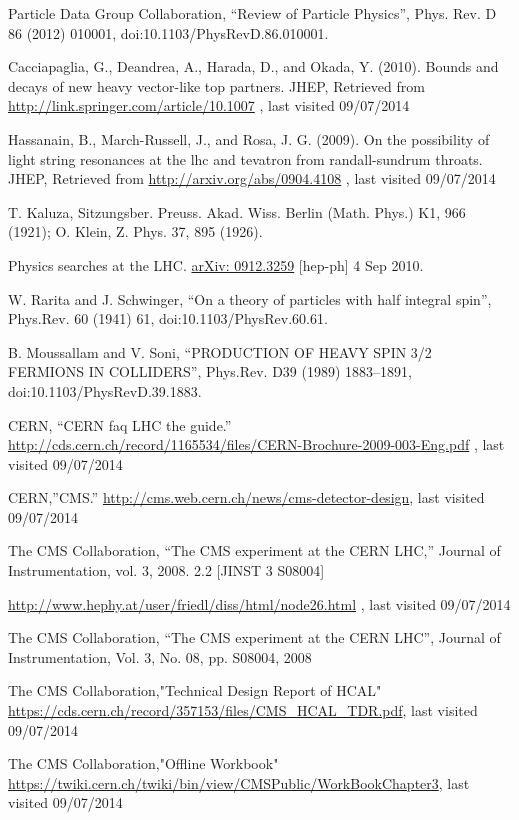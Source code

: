 \documentclass[12pt,oneandhalf,chaparabic,phys,ms,eng]{metu}
\begin{document}
\begin{thebibliography}{99}
  Particle Data Group Collaboration, “Review of Particle Physics”, Phys. Rev. D 86 (2012) 010001, doi:10.1103/PhysRevD.86.010001.

	Cacciapaglia, G., Deandrea, A., Harada, D., and Okada, Y. (2010). Bounds and decays of new heavy vector-like top partners. JHEP, Retrieved from \url{http://link.springer.com/article/10.1007} , last visited 09/07/2014


	Hassanain, B., March-Russell, J., and Rosa, J. G. (2009). On the possibility of light string resonances at the lhc and tevatron from randall-sundrum throats. JHEP, Retrieved from \url{http://arxiv.org/abs/0904.4108} , last visited 09/07/2014

	T. Kaluza, Sitzungsber. Preuss. Akad. Wiss. Berlin (Math. Phys.) K1, 966 (1921); O. Klein, Z. Phys. 37, 895 (1926).

	Physics searches at the LHC. \url{arXiv: 0912.3259} [hep-ph] 4 Sep 2010.

	W. Rarita and J. Schwinger, “On a theory of particles with half integral spin”, Phys.Rev. 60 (1941) 61, doi:10.1103/PhysRev.60.61.

	B. Moussallam and V. Soni, “PRODUCTION OF HEAVY SPIN 3/2 FERMIONS IN COLLIDERS”, Phys.Rev. D39 (1989) 1883–1891, doi:10.1103/PhysRevD.39.1883.

	CERN, “CERN faq LHC the guide.” \url{http://cds.cern.ch/record/1165534/files/CERN-Brochure-2009-003-Eng.pdf} , last visited 09/07/2014

	CERN,”CMS.” \url{http://cms.web.cern.ch/news/cms-detector-design}, last visited 09/07/2014

	The CMS Collaboration, “The CMS experiment at the CERN LHC,” Journal of Instrumentation, vol. 3, 2008. 2.2 [JINST 3 S08004]

	\url{http://www.hephy.at/user/friedl/diss/html/node26.html} , last visited 09/07/2014

	The CMS Collaboration, “The CMS experiment at the CERN LHC”, Journal of Instrumentation, Vol. 3, No. 08, pp. S08004, 2008

	The CMS Collaboration,"Technical Design Report of HCAL" \url{https://cds.cern.ch/record/357153/files/CMS_HCAL_TDR.pdf}, last visited 09/07/2014

	The CMS Collaboration,"Offline Workbook" \url{https://twiki.cern.ch/twiki/bin/view/CMSPublic/WorkBookChapter3}, last visited 09/07/2014


\end{thebibliography}
\end{document}
